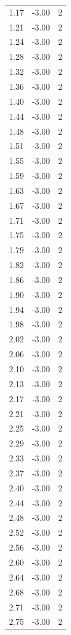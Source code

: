 \begin{longtable}{lrr}
  1.17 & -3.00 & 2 \\
  1.21 & -3.00 & 2 \\
  1.24 & -3.00 & 2 \\
  1.28 & -3.00 & 2 \\
  1.32 & -3.00 & 2 \\
  1.36 & -3.00 & 2 \\
  1.40 & -3.00 & 2 \\
  1.44 & -3.00 & 2 \\
  1.48 & -3.00 & 2 \\
  1.51 & -3.00 & 2 \\
  1.55 & -3.00 & 2 \\
  1.59 & -3.00 & 2 \\
  1.63 & -3.00 & 2 \\
  1.67 & -3.00 & 2 \\
  1.71 & -3.00 & 2 \\
  1.75 & -3.00 & 2 \\
  1.79 & -3.00 & 2 \\
  1.82 & -3.00 & 2 \\
  1.86 & -3.00 & 2 \\
  1.90 & -3.00 & 2 \\
  1.94 & -3.00 & 2 \\
  1.98 & -3.00 & 2 \\
  2.02 & -3.00 & 2 \\
  2.06 & -3.00 & 2 \\
  2.10 & -3.00 & 2 \\
  2.13 & -3.00 & 2 \\
  2.17 & -3.00 & 2 \\
  2.21 & -3.00 & 2 \\
  2.25 & -3.00 & 2 \\
  2.29 & -3.00 & 2 \\
  2.33 & -3.00 & 2 \\
  2.37 & -3.00 & 2 \\
  2.40 & -3.00 & 2 \\
  2.44 & -3.00 & 2 \\
  2.48 & -3.00 & 2 \\
  2.52 & -3.00 & 2 \\
  2.56 & -3.00 & 2 \\
  2.60 & -3.00 & 2 \\
  2.64 & -3.00 & 2 \\
  2.68 & -3.00 & 2 \\
  2.71 & -3.00 & 2 \\
  2.75 & -3.00 & 2 \\

\end{longtable}
